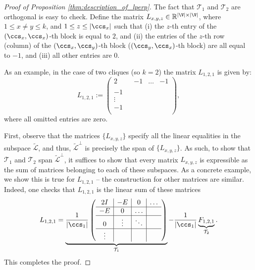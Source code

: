 \begin{proof}[Proof of Proposition \ref{thm:description_of_lperp}]
The fact that   $\mathcal{T}_{1}$ and $\mathcal{T}_{2}$ are  orthogonal is easy to check. Define the matrix $L_{x,y,z} \in \mathbb{R}^{|\V|\times|\V|}$, where $1 \leq x \neq y \leq k$, and $1 \leq z \leq |\ccs_x|$ such that (i) the $z$-th entry of the $(\ccs_x,\ccs_x)$-th block is equal to $2$, and (ii) the entries of the $z$-th row (column) of the $(\ccs_x,\ccs_y)$-th block ($(\ccs_y,\ccs_x)$-th block) are all equal to $-1$, and (iii) all other entries are $0$.

As an example, in the case of two cliques (so $k=2$)  the  matrix $L_{1,2,1} $ is given by:
$$
L_{1,2,1} := \left( \begin{array}{cc|ccc} 
2 & & -1 & \ldots & -1  \\
& & & &  \\
\hline
-1 & & & &   \\
\vdots & & & &  \\
-1 & & & &   \\
\end{array}\right),
$$
where all omitted entries are zero. 

First, observe that the matrices $\{ L_{x,y,z} \}$ specify all the linear equalities in the subspace $\tilde{\mathcal{L}}$, and thus, $\tilde{\mathcal{L}}^\perp$ is precisely the span of $\{ L_{x,y,z} \}$.  As such, to show that   $\mathcal{T}_{1}$ and $\mathcal{T}_{2}$  span $\tilde{\mathcal{L}}^\perp$, it suffices to show that every matrix $L_{x,y,z}$ is expressible as the sum of matrices belonging to each of these subspaces.  
As a concrete example, we show this is true for   $L_{1,2,1}$ -- the construction for other matrices are similar.
Indeed, one checks that $L_{1,2,1}$ is the linear sum of these matrices
$$ 
L_{1,2,1}= \underbrace{\frac{1}{|\ccs_1|} \left( \begin{array}{c|c|c|c} 2I & -E & 0 & \ldots \\ \hline -E & 0 & \ldots & \\ \hline 0 & \vdots & \ddots & \\ \hline \vdots & & & \end{array}\right) }_{\mathcal{T}_1}
 -\frac{1}{|\ccs_1|} \underbrace{F_{1,2,1}}_{\mathcal{T}_2}.$$
This completes the proof.
\end{proof}

